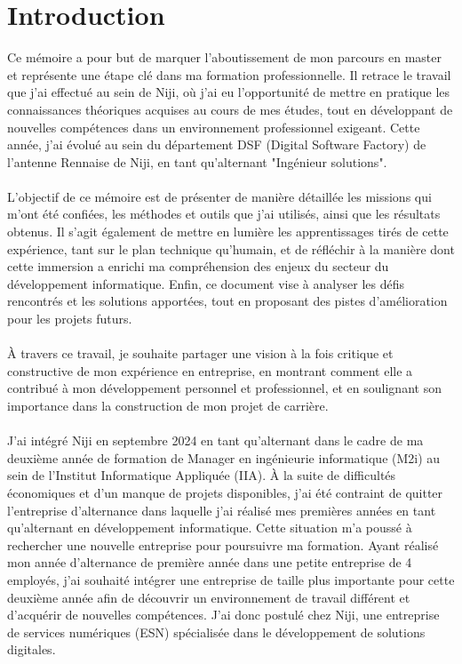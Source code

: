 \documentclass[12pt]{article}
\begin{document}
\section{Introduction}
Ce mémoire a pour but de marquer l'aboutissement de mon parcours en master et représente une étape clé dans ma formation professionnelle. Il retrace le travail que j’ai effectué au sein de Niji, où j’ai eu l’opportunité de mettre en pratique les connaissances théoriques acquises au cours de mes études, tout en développant de nouvelles compétences dans un environnement professionnel exigeant. Cette année, j'ai évolué au sein du département DSF (Digital Software Factory) de l'antenne Rennaise de Niji, en tant qu'alternant "Ingénieur solutions".
\\\\
L’objectif de ce mémoire est de présenter de manière détaillée les missions qui m’ont été confiées, les méthodes et outils que j’ai utilisés, ainsi que les résultats obtenus. Il s’agit également de mettre en lumière les apprentissages tirés de cette expérience, tant sur le plan technique qu’humain, et de réfléchir à la manière dont cette immersion a enrichi ma compréhension des enjeux du secteur du développement informatique. Enfin, ce document vise à analyser les défis rencontrés et les solutions apportées, tout en proposant des pistes d’amélioration pour les projets futurs.
\\\\
À travers ce travail, je souhaite partager une vision à la fois critique et constructive de mon expérience en entreprise, en montrant comment elle a contribué à mon développement personnel et professionnel, et en soulignant son importance dans la construction de mon projet de carrière.
\\\\
J'ai intégré Niji en septembre 2024 en tant qu'alternant dans le cadre de ma deuxième année de formation de Manager en ingénieurie informatique (M2i) au sein de l'Institut Informatique Appliquée (IIA). À la suite de difficultés économiques et d'un manque de projets disponibles, j'ai été contraint de quitter l'entreprise d'alternance dans laquelle j'ai réalisé mes premières années en tant qu'alternant en développement informatique. Cette situation m'a poussé à rechercher une nouvelle entreprise pour poursuivre ma formation. Ayant réalisé mon année d'alternance de première année dans une petite entreprise de 4 employés, j'ai souhaité intégrer une entreprise de taille plus importante pour cette deuxième année afin de découvrir un environnement de travail différent et d'acquérir de nouvelles compétences. J'ai donc postulé chez Niji, une entreprise de services numériques (ESN) spécialisée dans le développement de solutions digitales.
\end{document}
